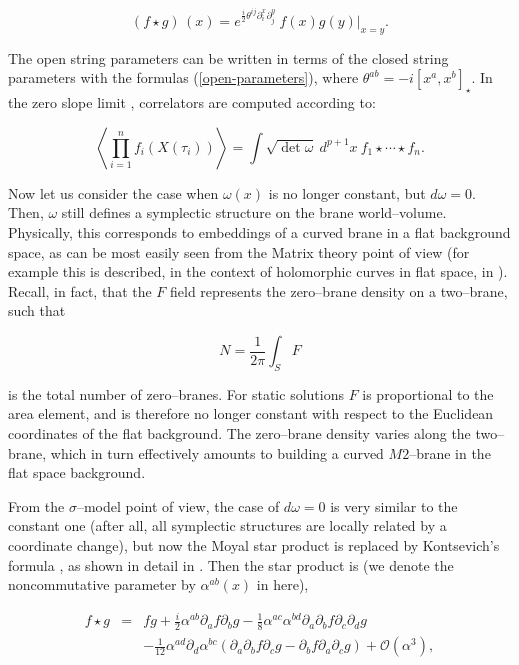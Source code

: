 \documentclass[a4paper,11pt]{article}
\newcommand{\notag}{\nonumber}
\begin{document}
\begin{equation}
\left( f\star g\right) \,\left( x\right) =e^{{\frac{i}{2}}\theta
^{ij}\partial _{i}^{x}\partial _{j}^{y}}\ f(x)g(y)|_{x=y}.
\end{equation}

\noindent 
The open string parameters can be written in terms of the closed string
parameters with the formulas (\ref{open-parameters}), where $\theta^{ab} =
-i[x^{a},x^{b}]_{\star}$. In the zero slope limit \cite {Seiberg-Witten},
correlators are computed according to:

$$
\left\langle \prod_{i=1}^{n} f_{i} \left( X(\tau_{i}) \right) \right\rangle
= \int \sqrt{\det \omega}\ d^{p+1}x\ f_{1} \star \cdots \star f_{n}.
$$

Now let us consider the case when $\omega \left( x\right)$ is no longer
constant, but $d\omega =0$. Then, $\omega $ still defines a symplectic
structure on the brane world--volume. Physically, this corresponds to
embeddings of a curved brane in a flat background space, as can be most
easily seen from the Matrix theory point of view (for example this is
described, in the context of holomorphic curves in flat space, in
\cite{Cornalba-Taylor, Cornalba-1}). Recall, in fact, that the $F$ field
represents the zero--brane density on a two--brane, such that

$$
N = {\frac{1}{2\pi}} \int_{S} F
$$

\noindent 
is the total number of zero--branes. For static solutions $F$ is
proportional to the area element, and is therefore no longer constant with
respect to the Euclidean coordinates of the flat background. The
zero--brane density varies along the two--brane, which in turn effectively
amounts to building a curved $M2$--brane in the flat space background.

From the $\sigma$--model point of view, the case of $d\omega =0$ is very
similar to the constant one (after all, all symplectic structures are
locally related by a coordinate change), but now the Moyal star product is
replaced by Kontsevich's formula \cite{Kontsevich}, as shown in detail in
\cite{Cattaneo-Felder}. Then the star product is (we denote the
noncommutative parameter by $\alpha^{ab} \left( x \right)$ in here),

\begin{eqnarray}
f\star g &=&fg+{\frac{i}{2}}\alpha ^{ab}\partial _{a}f\partial _{b}g-
{\frac{1}{8}}\alpha ^{ac}\alpha ^{bd}\partial _{a}\partial _{b}f
\partial_{c}\partial _{d}g  \notag \\
&&-{\frac{1}{12}}\alpha ^{ad}\partial _{d}\alpha ^{bc}\left( \partial
_{a}\partial _{b}f\partial _{c}g-\partial _{b}f\partial _{a}\partial
_{c}g\right) +\mathcal{O}(\alpha ^{3}),  \label{kontsevich}
\end{eqnarray}
\end{document}
